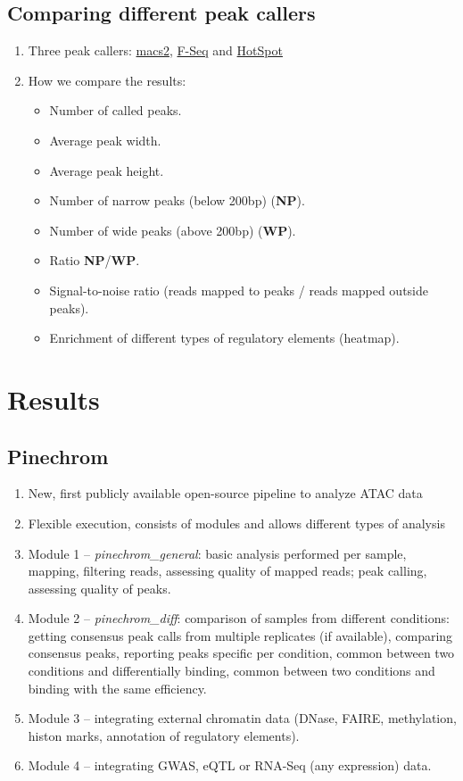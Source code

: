 \documentclass[11pt]{article}
\begin{document}
\subsection{Comparing different peak callers}
\begin{enumerate}
\itemsep0em
  \item Three peak callers:
        \href{https://pypi.python.org/pypi/MACS2}{macs2}, 
        \href{http://fureylab.web.unc.edu/software/fseq/}{F-Seq} and 
        \href{http://www.uwencode.org/proj/hotspot-ptih/}{HotSpot}
  \item How we compare the results:
  \begin{itemize}
    \item Number of called peaks.
    \item Average peak width.
    \item Average peak height.
    \item Number of narrow peaks (below 200bp) (\textbf{NP}).
    \item Number of wide peaks (above 200bp) (\textbf{WP}).
    \item Ratio \textbf{NP}/\textbf{WP}.
    \item Signal-to-noise ratio (reads mapped to peaks / reads mapped
          outside peaks).
    \item Enrichment of different types of regulatory elements (heatmap).
  \end{itemize}
\end{enumerate}

\section{Results}

\subsection{Pinechrom}
\begin{enumerate}
\itemsep0em
  \item New, first publicly available open-source pipeline to analyze ATAC data
  \item Flexible execution, consists of modules and allows different types of analysis
  \item Module 1 -- \textit{pinechrom\_general}: basic analysis performed per sample, 
         mapping, filtering reads, assessing quality of mapped reads; peak calling,
         assessing quality of peaks.
  \item Module 2 -- \textit{pinechrom\_diff}: comparison of samples from different
         conditions: getting consensus peak calls from multiple replicates (if available), 
         comparing consensus peaks, reporting peaks specific per condition, common 
         between two conditions and differentially binding, common between two
         conditions and binding with the same efficiency.
  \item Module 3 -- integrating external chromatin data (DNase, FAIRE, methylation,
         histon marks, annotation of regulatory elements).
  \item Module 4 -- integrating GWAS, eQTL or RNA-Seq (any expression) data.
\end{enumerate}
\end{document}

